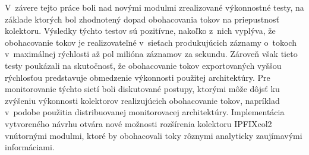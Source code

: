V~závere tejto práce boli nad novými modulmi zrealizované výkonnostné testy, na základe ktorých bol zhodnotený dopad obohacovania tokov na priepustnosť kolektoru. Výsledky týchto testov sú pozitívne, nakoľko z~nich vyplýva, že obohacovanie tokov
je realizovateľné v~sieťach produkujúcich záznamy o~tokoch v~maximálnej rýchlosti až pol milióna záznamov za sekundu. Zároveň však tieto testy poukázali na skutočnosť, že obohacovanie tokov exportovaných vyššou rýchlosťou predstavuje obmedzenie výkonnosti
použitej architektúry. Pre monitorovanie týchto sietí boli diskutované postupy, ktorými môže dôjsť ku zvýšeniu výkonnosti kolektorov realizujúcich obohacovanie tokov, napríklad v~podobe použitia distribuovanej monitorovacej
architektúry. Implementácia vytvoreného návrhu otvára nové možnosti rozšírenia kolektoru IPFIXcol2 vnútornými modulmi, ktoré by obohacovali toky rôznymi analyticky zaujímavými informáciami.